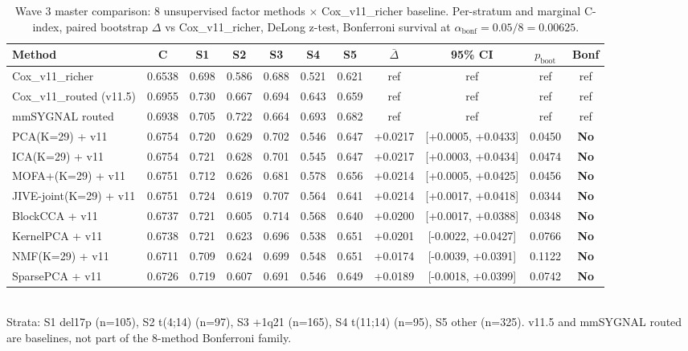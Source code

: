 \begin{table}[ht]
\centering
\caption{Wave 3 master comparison: 8 unsupervised factor methods $\times$ Cox\_v11\_richer baseline. Per-stratum and marginal C-index, paired bootstrap $\Delta$ vs Cox\_v11\_richer, DeLong z-test, Bonferroni survival at $\alpha_{\text{bonf}}=0.05/8=0.00625$.}
\label{tab:wave3_master}
\small
\begin{tabular}{lcccccccccc}
\hline
Method & C & S1 & S2 & S3 & S4 & S5 & $\bar{\Delta}$ & 95\% CI & $p_{\text{boot}}$ & Bonf \\
\hline
Cox\_v11\_richer & 0.6538 & 0.698 & 0.586 & 0.688 & 0.521 & 0.621 & ref & ref & ref & ref \\
Cox\_v11\_routed (v11.5) & 0.6955 & 0.730 & 0.667 & 0.694 & 0.643 & 0.659 & ref & ref & ref & ref \\
mmSYGNAL routed & 0.6938 & 0.705 & 0.722 & 0.664 & 0.693 & 0.682 & ref & ref & ref & ref \\
\hline
PCA(K=29) + v11 & 0.6754 & 0.720 & 0.629 & 0.702 & 0.546 & 0.647 & +0.0217 & [+0.0005, +0.0433] & 0.0450 & \textbf{No} \\
ICA(K=29) + v11 & 0.6754 & 0.721 & 0.628 & 0.701 & 0.545 & 0.647 & +0.0217 & [+0.0003, +0.0434] & 0.0474 & \textbf{No} \\
MOFA+(K=29) + v11 & 0.6751 & 0.712 & 0.626 & 0.681 & 0.578 & 0.656 & +0.0214 & [+0.0005, +0.0425] & 0.0456 & \textbf{No} \\
JIVE-joint(K=29) + v11 & 0.6751 & 0.724 & 0.619 & 0.707 & 0.564 & 0.641 & +0.0214 & [+0.0017, +0.0418] & 0.0344 & \textbf{No} \\
BlockCCA + v11 & 0.6737 & 0.721 & 0.605 & 0.714 & 0.568 & 0.640 & +0.0200 & [+0.0017, +0.0388] & 0.0348 & \textbf{No} \\
KernelPCA + v11 & 0.6738 & 0.721 & 0.623 & 0.696 & 0.538 & 0.651 & +0.0201 & [-0.0022, +0.0427] & 0.0766 & \textbf{No} \\
NMF(K=29) + v11 & 0.6711 & 0.709 & 0.624 & 0.699 & 0.548 & 0.651 & +0.0174 & [-0.0039, +0.0391] & 0.1122 & \textbf{No} \\
SparsePCA + v11 & 0.6726 & 0.719 & 0.607 & 0.691 & 0.546 & 0.649 & +0.0189 & [-0.0018, +0.0399] & 0.0742 & \textbf{No} \\
\hline
\end{tabular}
\\[2pt]
\footnotesize Strata: S1 del17p (n=105), S2 t(4;14) (n=97), S3 +1q21 (n=165), S4 t(11;14) (n=95), S5 other (n=325). v11.5 and mmSYGNAL routed are baselines, not part of the 8-method Bonferroni family.
\end{table}
